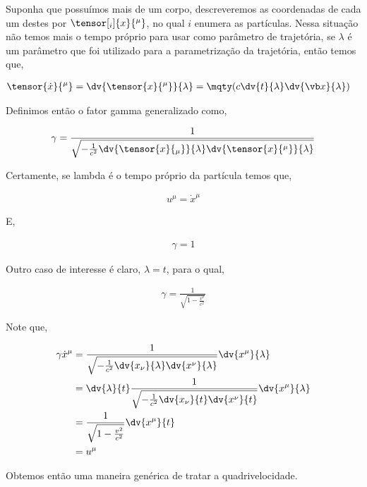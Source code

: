 \documentclass[twoside]{amsart}
\numberwithin{equation}{section}
\begin{document}
Suponha que possuímos mais de um corpo, descreveremos as coordenadas de cada um destes por $\tensor[_i]{x}{^\mu}$, no qual $i$ enumera as partículas. Nessa situação não temos mais o tempo próprio para usar como parâmetro de trajetória, se $\lambda$ é um parâmetro que foi utilizado para a parametrização da trajetória, então temos que,

\begin{align}
    \tensor{\dot{x}}{^\mu}=\dv{\tensor{x}{^\mu}}{\lambda}=\mqty(c\dv{t}{\lambda}&\dv{\vb x}{\lambda})
\end{align}

Definimos então o fator gamma generalizado como,

\begin{align}
    \gamma=\frac{1}{\sqrt{-\frac{1}{c^2}\dv{\tensor{x}{_\mu}}{\lambda}\dv{\tensor{x}{^\mu}}{\lambda}}}
\end{align}

Certamente, se lambda é o tempo próprio da partícula temos que,

\begin{align}
    u^\mu=\dot{x}^\mu
\end{align}

E,

\begin{align}
    \gamma=1
\end{align}

Outro caso de interesse é claro, $\lambda=t$, para o qual,

\begin{align}
    \gamma=\frac{1}{\sqrt{1-\frac{v^2}{c^2}}}
\end{align}

Note que,

\begin{align}
    \gamma \dot{x}^\mu&=\frac{1}{\sqrt{-\frac{1}{c^2}\dv{x_\nu}{\lambda}\dv{x^\nu}{\lambda}}}\dv{x^\mu}{\lambda}\\
    &=\dv{\lambda}{t}\frac{1}{\sqrt{-\frac{1}{c^2}\dv{x_\nu}{t}\dv{x^\nu}{t}}}\dv{x^\mu}{\lambda}\\
    &=\frac{1}{\sqrt{1-\frac{v^2}{c^2}}}\dv{x^\mu}{t}\\
    &=u^\mu
\end{align}

Obtemos então uma maneira genérica de tratar a quadrivelocidade.


\end{document}

